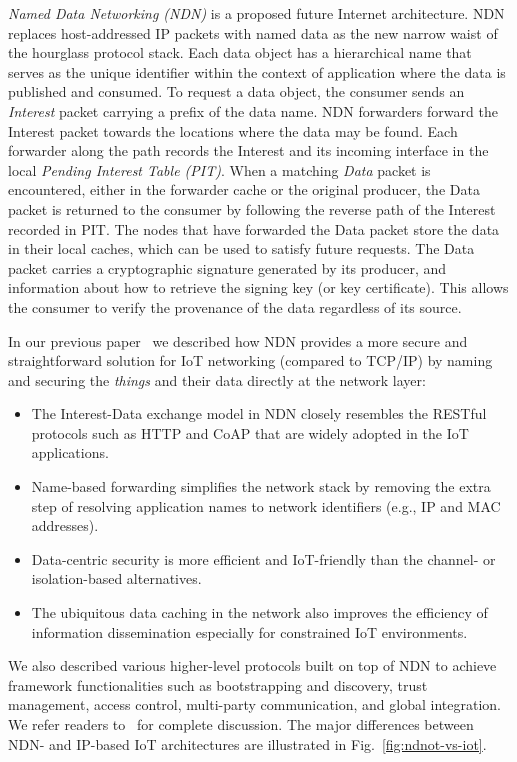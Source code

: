 \emph{Named Data Networking (NDN)} is a proposed future Internet architecture.
NDN replaces host-addressed IP packets with named data as the new narrow waist of the hourglass protocol stack.
Each data object has a hierarchical name that serves as the unique identifier within the context of application where the data is published and consumed.
To request a data object, the consumer sends an \emph{Interest} packet carrying a prefix of the data name.
 NDN forwarders forward the Interest packet towards the locations where the data may be found.
Each forwarder along the path records the Interest and its incoming interface in the local \emph{Pending Interest Table (PIT)}.
When a matching \emph{Data} packet is encountered, either in the forwarder cache or the original producer, the Data packet is returned to the consumer by following the reverse path of the Interest recorded in PIT.
The nodes that have forwarded the Data packet store the data in their local caches, which can be used to satisfy future requests.
The Data packet carries a cryptographic signature generated by its producer, and information about how to retrieve the signing key (or key certificate).
This allows the consumer to verify the provenance of the data regardless of its source.

In our previous paper~\cite{ndn-iot} we described how NDN provides a more secure and straightforward solution for IoT networking (compared to TCP/IP) by naming and securing the \emph{things} and their data directly at the network layer:
\begin{itemize}
\item The Interest-Data exchange model in NDN closely resembles the RESTful protocols such as HTTP and CoAP that are widely adopted in the IoT applications.
\item Name-based forwarding simplifies the network stack by removing the extra step of resolving application names to network identifiers (e.g., IP and MAC addresses).
\item Data-centric security is more efficient and IoT-friendly than the channel- or isolation-based alternatives.
\item The ubiquitous data caching in the network also improves the efficiency of information dissemination especially for constrained IoT environments.
\end{itemize}
We also described various higher-level protocols built on top of NDN to achieve framework functionalities such as bootstrapping and discovery, trust management, access control, multi-party communication, and global integration.
We refer readers to~\cite{ndn-iot} for complete discussion.
The major differences between NDN- and IP-based IoT architectures are illustrated in Fig.~\ref{fig:ndnot-vs-iot}.

